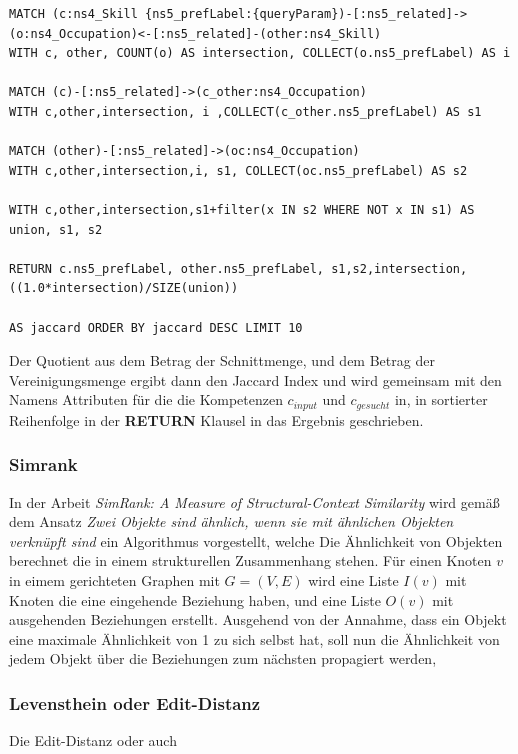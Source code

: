 \begin{lstlisting}[language=SPARQL, morekeywords={MATCH, WITH, COLLECT}]
MATCH (c:ns4_Skill {ns5_prefLabel:{queryParam})-[:ns5_related]->(o:ns4_Occupation)<-[:ns5_related]-(other:ns4_Skill)
WITH c, other, COUNT(o) AS intersection, COLLECT(o.ns5_prefLabel) AS i

MATCH (c)-[:ns5_related]->(c_other:ns4_Occupation)
WITH c,other,intersection, i ,COLLECT(c_other.ns5_prefLabel) AS s1

MATCH (other)-[:ns5_related]->(oc:ns4_Occupation)
WITH c,other,intersection,i, s1, COLLECT(oc.ns5_prefLabel) AS s2

WITH c,other,intersection,s1+filter(x IN s2 WHERE NOT x IN s1) AS union, s1, s2

RETURN c.ns5_prefLabel, other.ns5_prefLabel, s1,s2,intersection,((1.0*intersection)/SIZE(union)) 

AS jaccard ORDER BY jaccard DESC LIMIT 10

\end{lstlisting}


Der Quotient aus dem Betrag der Schnittmenge, und dem Betrag der Vereinigungsmenge ergibt dann den Jaccard Index und wird gemeinsam mit den Namens Attributen für die die Kompetenzen $c_{input}$ und $c_{gesucht}$  in, in sortierter Reihenfolge in der \textbf{RETURN} Klausel in das Ergebnis geschrieben.

\subsubsection{Simrank}

In der Arbeit \textit{SimRank: A Measure of Structural-Context Similarity} wird gemäß dem Ansatz \textit{Zwei Objekte sind ähnlich, wenn sie mit ähnlichen Objekten verknüpft sind} ein Algorithmus vorgestellt, welche Die Ähnlichkeit von Objekten berechnet die in einem strukturellen Zusammenhang stehen. Für einen Knoten $v$ in eimem gerichteten Graphen mit $G = (V,E) $ wird eine Liste $I(v)$ mit Knoten die eine eingehende Beziehung haben, und eine Liste $O(v)$ mit ausgehenden Beziehungen erstellt. Ausgehend von der Annahme, dass ein Objekt eine maximale Ähnlichkeit von 1 zu sich selbst hat, soll nun die Ähnlichkeit von jedem Objekt über die Beziehungen zum nächsten propagiert werden, 	

\subsubsection{Levensthein oder Edit-Distanz}

Die Edit-Distanz oder auch 


